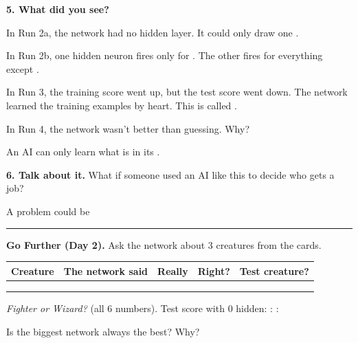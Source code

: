 \documentclass[11pt]{article}
\begin{document}
\vspace{0.4em}
\ifkey{\small\textcolor{keyred}{Scores change a little with each random split. The patterns stay the same.}}\fi

\newpage


{\large\textbf{5. What did you see?}}

\vspace{0.5em}
In Run 2a, the network had no hidden layer. It could only draw one .

\vspace{0.9em}
In Run 2b, one hidden neuron fires only for . The other fires for everything except .

\vspace{0.9em}
In Run 3, the training score went up, but the test score went down. The network learned the training examples by heart. This is called .

\vspace{0.9em}
In Run 4, the network wasn't better than guessing. Why? 

\vspace{0.9em}
An AI can only learn what is in its .

\vspace{1.1em}
{\large\textbf{6. Talk about it.}} What if someone used an AI like this to decide who gets a job?

\vspace{0.6em}
A problem could be 

\vspace{0.9em}
\blank{6.9in}

\vspace{1.2em}
\hrule
\vspace{0.8em}
{\large\textbf{Go Further (Day 2).}} Ask the network about 3 creatures from the cards.

\vspace{0.3em}
\begin{tabular}{|R{1.4in}|R{1.5in}|R{1.4in}|c|c|}
\hline
\textbf{Creature} & \textbf{The network said} & \textbf{Really} & \textbf{Right?} & \textbf{Test creature?} \\ \hline
{} & & & & \\[0.2em] \hline
 & & & & \\[0.2em] \hline
 & & & & \\[0.2em] \hline
\end{tabular}

\vspace{0.6em}
\textit{Fighter or Wizard?} (all 6 numbers). Test score with 0 hidden:  :  : 

\vspace{0.6em}
Is the biggest network always the best?  \quad Why? 
\end{document}
